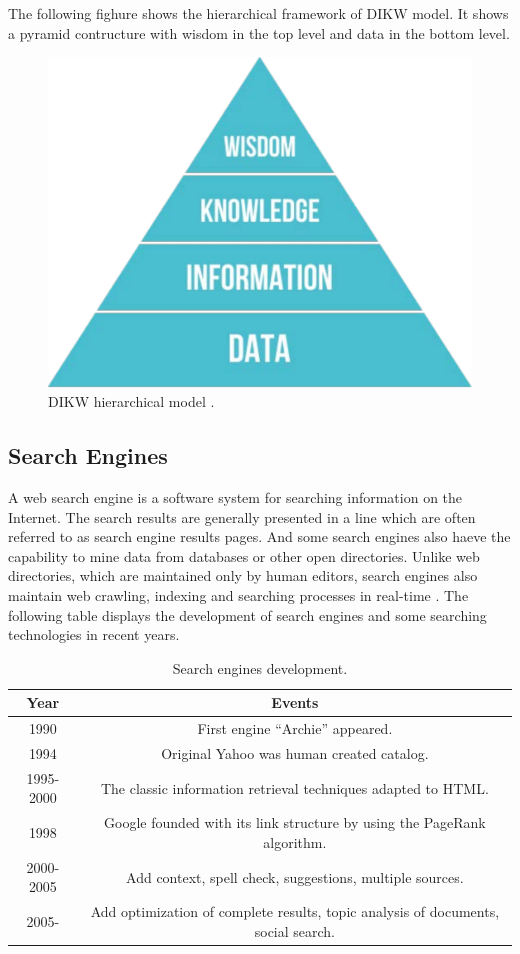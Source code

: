 \documentclass[sigconf]{acmart}
\begin{document}
The following fighure shows the hierarchical framework of DIKW model. It shows a pyramid contructure with wisdom in the top level and data in the bottom level.
\begin{figure}
\includegraphics[width=0.30\columnwidth]{images/DIKW_Pyramid}
\caption{DIKW hierarchical model \cite{editor06}.}
\end{figure}

\subsection{Search Engines}
A web search engine is a software system for searching information on the Internet. The search results are generally presented in a line which are often referred to as search engine results pages. And some search engines also haeve the capability to mine data from databases or other open directories. Unlike web directories, which are maintained only by human editors, search engines also maintain web crawling, indexing and searching processes in real-time \cite{editor05}. The following table displays the development of search engines and some searching technologies in recent years.
\begin{table}
\centering
\begin{tabular}{|c|c|} \hline
\textsf{Year} & \textsf{Events} \\ \hline
1990 & First engine ``Archie'' appeared. \\ \hline
1994 & Original Yahoo was human created catalog. \\ \hline
1995-2000 & The classic information retrieval techniques adapted to HTML. \\ \hline 
1998 & Google founded with its link structure by using the PageRank algorithm. \\ \hline
2000-2005 & Add context, spell check, suggestions, multiple sources. \\ \hline
2005- & Add optimization of complete results, topic analysis of documents, social search. \\ \hline
\end{tabular}
\caption{Search engines development.}
\end{table}
\end{document}
